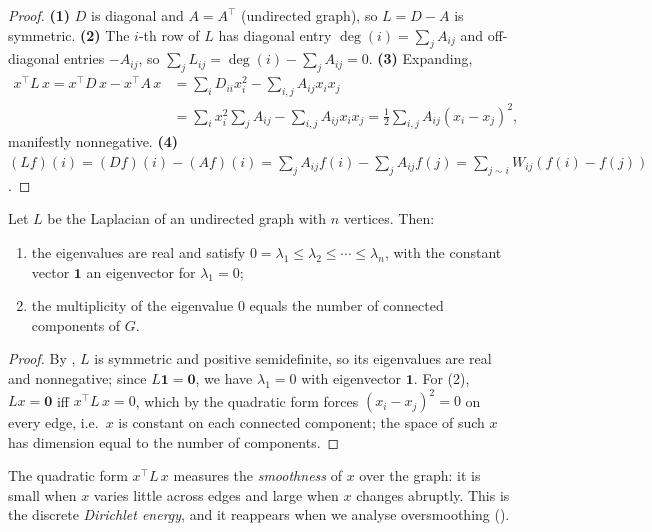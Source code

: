 \begin{proof}
\textbf{(1)} $D$ is diagonal and $A = A^\top$ (undirected graph), so $L = D - A$
is symmetric. \textbf{(2)} The $i$-th row of $L$ has diagonal entry
$\deg(i) = \sum_j A_{ij}$ and off-diagonal entries $-A_{ij}$, so
$\sum_j L_{ij} = \deg(i) - \sum_j A_{ij} = 0$. \textbf{(3)} Expanding,
\begin{align*}
  x^\top L\, x = x^\top D\, x - x^\top A\, x
    &= \sum_i D_{ii} x_i^2 - \sum_{i,j} A_{ij} x_i x_j \\
    &= \sum_i x_i^2 \sum_j A_{ij} - \sum_{i,j} A_{ij} x_i x_j
    = \tfrac12 \sum_{i,j} A_{ij}(x_i - x_j)^2 ,
\end{align*}
manifestly nonnegative. \textbf{(4)}
$(Lf)(i) = (Df)(i) - (Af)(i) = \sum_j A_{ij} f(i) - \sum_j A_{ij} f(j)
= \sum_{j \sim i} W_{ij}(f(i) - f(j))$.
\end{proof}

\begin{proposition}
\label{prop:graphs:laplacian-props}
Let $L$ be the Laplacian of an undirected graph with $n$ vertices. Then:
\begin{enumerate}
  \item the eigenvalues are real and satisfy
        $0 = \lambda_1 \le \lambda_2 \le \cdots \le \lambda_n$, with the constant
        vector $\mathbf{1}$ an eigenvector for $\lambda_1 = 0$;
  \item the multiplicity of the eigenvalue $0$ equals the number of connected
        components of $G$.
\end{enumerate}
\end{proposition}

\begin{proof}
By , $L$ is symmetric and positive
semidefinite, so its eigenvalues are real and nonnegative; since
$L \mathbf{1} = \mathbf{0}$, we have $\lambda_1 = 0$ with eigenvector
$\mathbf{1}$. For (2), $L x = \mathbf{0}$ iff $x^\top L\, x = 0$, which by the
quadratic form forces $(x_i - x_j)^2 = 0$ on every edge, i.e.\ $x$ is constant on
each connected component; the space of such $x$ has dimension equal to the number
of components.
\end{proof}

The quadratic form $x^\top L\, x$ measures the \emph{smoothness} of $x$ over the
graph: it is small when $x$ varies little across edges and large when $x$ changes
abruptly. This is the discrete \emph{Dirichlet energy}, and it reappears when we
analyse oversmoothing ().

